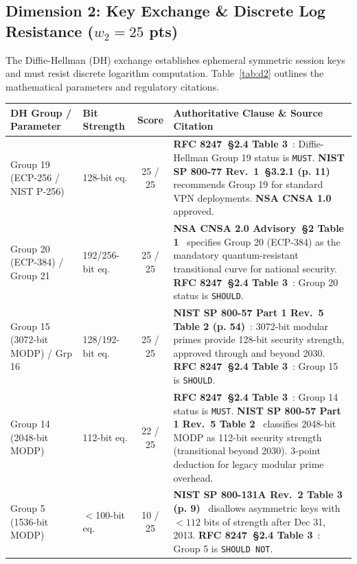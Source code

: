 \documentclass[11pt,a4paper]{article}
\begin{document}
\subsection{Dimension 2: Key Exchange \& Discrete Log Resistance ($w_2 = 25$ pts)}
The Diffie-Hellman (DH) exchange establishes ephemeral symmetric session keys and must resist discrete logarithm computation. Table~\ref{tab:d2} outlines the mathematical parameters and regulatory citations.

\begin{table}[h!]
\centering
\small
\begin{tabularx}{\textwidth}{llcX}
\toprule
\textbf{DH Group / Parameter} & \textbf{Bit Strength} & \textbf{Score} & \textbf{Authoritative Clause \& Source Citation} \\
\midrule
Group 19 (ECP-256 / NIST P-256) & 128-bit eq. & 25 / 25 & \textbf{RFC 8247~\S 2.4 Table 3}~\cite{rfc8247}: Diffie-Hellman Group 19 status is \texttt{MUST}. \textbf{NIST SP 800-77 Rev.~1~\S 3.2.1 (p. 11)}~\cite{nist800-77r1} recommends Group 19 for standard VPN deployments. \textbf{NSA CNSA 1.0}~\cite{cnsa2} approved. \\
\addlinespace
Group 20 (ECP-384) / Group 21 & 192/256-bit eq. & 25 / 25 & \textbf{NSA CNSA 2.0 Advisory~\S 2 Table 1}~\cite{cnsa2} specifies Group 20 (ECP-384) as the mandatory quantum-resistant transitional curve for national security. \textbf{RFC 8247~\S 2.4 Table 3}~\cite{rfc8247}: Group 20 status is \texttt{SHOULD}. \\
\addlinespace
Group 15 (3072-bit MODP) / Grp 16 & 128/192-bit eq. & 25 / 25 & \textbf{NIST SP 800-57 Part 1 Rev.~5 Table 2 (p. 54)}~\cite{nist800-57p1r5}: 3072-bit modular primes provide 128-bit security strength, approved through and beyond 2030. \textbf{RFC 8247~\S 2.4 Table 3}~\cite{rfc8247}: Group 15 is \texttt{SHOULD}. \\
\addlinespace
Group 14 (2048-bit MODP) & 112-bit eq. & 22 / 25 & \textbf{RFC 8247~\S 2.4 Table 3}~\cite{rfc8247}: Group 14 status is \texttt{MUST}. \textbf{NIST SP 800-57 Part 1 Rev.~5 Table 2}~\cite{nist800-57p1r5} classifies 2048-bit MODP as 112-bit security strength (transitional beyond 2030). 3-point deduction for legacy modular prime overhead. \\
\addlinespace
Group 5 (1536-bit MODP) & $<$100-bit eq. & 10 / 25 & \textbf{NIST SP 800-131A Rev.~2 Table 3 (p. 9)}~\cite{nist800-131ar2} disallows asymmetric keys with $<112$ bits of strength after Dec 31, 2013. \textbf{RFC 8247~\S 2.4 Table 3}~\cite{rfc8247}: Group 5 is \texttt{SHOULD NOT}. \\

\end{tabularx}
\end{table}
\end{document}
